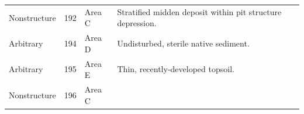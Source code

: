 \documentclass[
  12pt,
]{krantz}
\begin{document}
\begin{longtable}[]{@{}llll@{}}
\begin{minipage}[t]{0.18\columnwidth}\raggedright
Nonstructure\strut
\end{minipage} & \begin{minipage}[t]{0.11\columnwidth}\raggedright
192\strut
\end{minipage} & \begin{minipage}[t]{0.16\columnwidth}\raggedright
Area C\strut
\end{minipage} & \begin{minipage}[t]{0.38\columnwidth}\raggedright
Stratified midden deposit
within pit structure
depression.\strut
\end{minipage}\tabularnewline
\begin{minipage}[t]{0.18\columnwidth}\raggedright
Arbitrary\strut
\end{minipage} & \begin{minipage}[t]{0.11\columnwidth}\raggedright
194\strut
\end{minipage} & \begin{minipage}[t]{0.16\columnwidth}\raggedright
Area D\strut
\end{minipage} & \begin{minipage}[t]{0.38\columnwidth}\raggedright
Undisturbed, sterile native
sediment.\strut
\end{minipage}\tabularnewline
\begin{minipage}[t]{0.18\columnwidth}\raggedright
Arbitrary\strut
\end{minipage} & \begin{minipage}[t]{0.11\columnwidth}\raggedright
195\strut
\end{minipage} & \begin{minipage}[t]{0.16\columnwidth}\raggedright
Area E\strut
\end{minipage} & \begin{minipage}[t]{0.38\columnwidth}\raggedright
Thin, recently-developed
topsoil.\strut
\end{minipage}\tabularnewline
\begin{minipage}[t]{0.18\columnwidth}\raggedright
Nonstructure\strut
\end{minipage} & \begin{minipage}[t]{0.11\columnwidth}\raggedright
196\strut
\end{minipage} & \begin{minipage}[t]{0.16\columnwidth}\raggedright
Area C\strut
\end{minipage} & \begin{minipage}[t]{0.38\columnwidth}\raggedright

\end{minipage}
\end{longtable}
\end{document}
